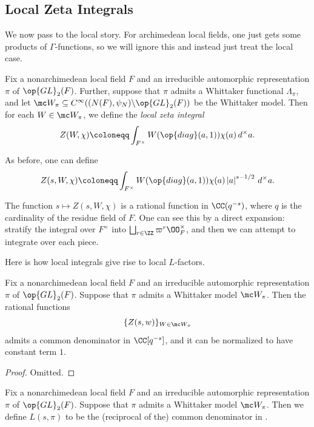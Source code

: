 \documentclass[../notes.tex]{subfiles}
\begin{document}
\subsection{Local Zeta Integrals}
We now pass to the local story. For archimedean local fields, one just gets some products of $\Gamma$-functions, so we will ignore this and instead just treat the local case.
\begin{definition}
	Fix a nonarchimedean local field $F$ and an irreducible automorphic representation $\pi$ of $\op{GL}_2(F)$. Further, suppose that $\pi$ admits a Whittaker functional $\Lambda_\pi$, and let $\mc W_\pi\subseteq C^\infty((N(F),\psi_N)\backslash\op{GL}_2(F))$ be the Whittaker model. Then for each $W\in\mc W_\pi$, we define the \textit{local zeta integral}
	\[Z(W,\chi)\coloneqq\int_{F^\times}W(\op{diag}(a,1))\chi(a)\,d^\times a.\]
\end{definition}
\begin{remark}
	As before, one can define
	\[Z(s,W,\chi)\coloneqq\int_{F^\times}W(\op{diag}(a,1))\chi(a)\left|a\right|^{s-1/2}\,d^\times a.\]
\end{remark}
\begin{remark}
	The function $s\mapsto Z(s,W,\chi)$ is a rational function in $\CC(q^{-s})$, where $q$ is the cardinality of the residue field of $F$. One can see this by a direct expansion: stratify the integral over $F^\times$ into $\bigsqcup_{r\in\ZZ}\varpi^r\OO_F^\times$, and then we can attempt to integrate over each piece.
\end{remark}
Here is how local integrals give rise to local $L$-factors.
\begin{proposition} \label{prop:get-local-l-factor}
	Fix a nonarchimedean local field $F$ and an irreducible automorphic representation $\pi$ of $\op{GL}_2(F)$. Suppose that $\pi$ admits a Whittaker model $\mc W_\pi$. Then the rational functions
	\[\{Z(s,w)\}_{W\in\mc W_\pi}\]
	admits a common denominator in $\CC[q^{-s}]$, and it can be normalized to have constant term $1$.
\end{proposition}
\begin{proof}
	Omitted.
\end{proof}
\begin{definition}
	Fix a nonarchimedean local field $F$ and an irreducible automorphic representation $\pi$ of $\op{GL}_2(F)$. Suppose that $\pi$ admits a Whittaker model $\mc W_\pi$. Then we define $L(s,\pi)$ to be the (reciprocal of the) common denominator in .
\end{definition}
\end{document}
